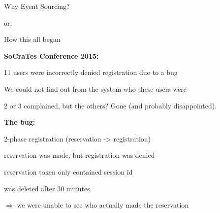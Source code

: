 \begin{frame}[fragile]{}

\begin{center}
{
\LARGE
Why Event Sourcing?
}

\vspace{2em}

or:

\vspace{2em}

{
\Large
How this all began
}
\end{center}
\end{frame}

\begin{frame}[fragile]{}

\renewcommand{\SPACE}{1em}

\textbf{SoCraTes Conference 2015:}
\vspace{\SPACE}                 
                
11 users were incorrectly denied registration due to a bug
\vspace{\SPACE}                 
                  
We could not find out from the system who these users were
\vspace{\SPACE}                 
                  
2 or 3 complained, but the others? Gone (and probably disappointed).


\end{frame}

\begin{frame}[fragile]{}

\renewcommand{\SPACE}{1em}

\textbf{The bug:}
\vspace{\SPACE}                 

2-phase registration (reservation -> registration)
\vspace{\SPACE}                 
                  
reservation was made, but registration was denied
\vspace{\SPACE}                 
                  
reservation token only contained session id

was deleted after 30 minutes
\vspace{\SPACE}                 
                  
$\Longrightarrow$ we were unable to see who actually made the reservation
\vspace{\SPACE}                 
             
\end{frame}

